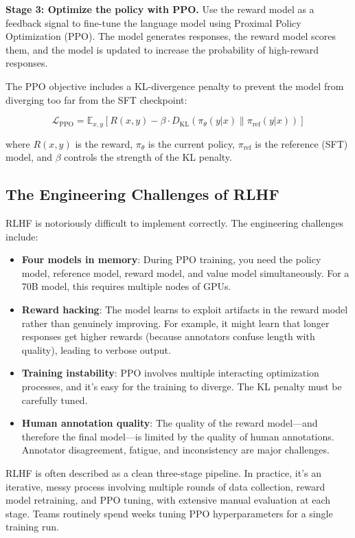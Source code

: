 \textbf{Stage 3: Optimize the policy with PPO.} Use the reward model as a feedback signal to fine-tune the language model using Proximal Policy Optimization (PPO). The model generates responses, the reward model scores them, and the model is updated to increase the probability of high-reward responses.

The PPO objective includes a KL-divergence penalty to prevent the model from diverging too far from the SFT checkpoint:

$$\mathcal{L}_{\text{PPO}} = \mathbb{E}_{x,y}\left[R(x, y) - \beta \cdot D_{\text{KL}}\left(\pi_\theta(y|x) \| \pi_{\text{ref}}(y|x)\right)\right]$$

where $R(x,y)$ is the reward, $\pi_\theta$ is the current policy, $\pi_{\text{ref}}$ is the reference (SFT) model, and $\beta$ controls the strength of the KL penalty.

\subsection{The Engineering Challenges of RLHF}

RLHF is notoriously difficult to implement correctly. The engineering challenges include:

\begin{itemize}[leftmargin=*]
    \item \textbf{Four models in memory}: During PPO training, you need the policy model, reference model, reward model, and value model simultaneously. For a 70B model, this requires multiple nodes of GPUs.
    \item \textbf{Reward hacking}: The model learns to exploit artifacts in the reward model rather than genuinely improving. For example, it might learn that longer responses get higher rewards (because annotators confuse length with quality), leading to verbose output.
    \item \textbf{Training instability}: PPO involves multiple interacting optimization processes, and it's easy for the training to diverge. The KL penalty must be carefully tuned.
    \item \textbf{Human annotation quality}: The quality of the reward model---and therefore the final model---is limited by the quality of human annotations. Annotator disagreement, fatigue, and inconsistency are major challenges.
\end{itemize}

\begin{cautionbox}
RLHF is often described as a clean three-stage pipeline. In practice, it's an iterative, messy process involving multiple rounds of data collection, reward model retraining, and PPO tuning, with extensive manual evaluation at each stage. Teams routinely spend weeks tuning PPO hyperparameters for a single training run.
\end{cautionbox}

